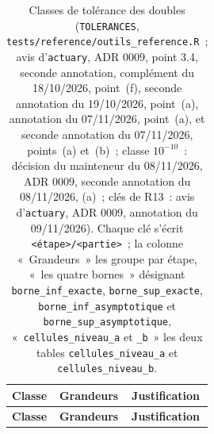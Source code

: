 \documentclass[a4paper,11pt]{article}
\newcommand{\code}[1]{\texttt{\small #1}}
\begin{document}
{\small
{}
\begin{longtable}{@{}p{1.4cm}>{\raggedright\arraybackslash}p{9.4cm}p{3.8cm}@{}}
\caption{Classes de tolérance des doubles (\code{TOLERANCES},
\code{tests/reference/outils\_reference.R}~; avis d'\code{actuary},
ADR 0009, point 3.4, seconde annotation, complément du 18/10/2026,
point~(f), seconde annotation du 19/10/2026, point~(a), annotation du
07/11/2026, point~(a), et seconde annotation du 07/11/2026, points~(a) et~(b)~; classe $10^{-10}$~: décision du mainteneur du 08/11/2026, ADR 0009, seconde annotation du 08/11/2026, (a)~; clés de R13~: avis d'\code{actuary}, ADR 0009, annotation du 09/11/2026).
Chaque clé s'écrit \code{<étape>/<partie>}~; la colonne «~Grandeurs~» les
groupe par étape, «~les quatre bornes~» désignant \code{borne\_inf\_exacte},
\code{borne\_sup\_exacte}, \code{borne\_inf\_asymptotique} et
\code{borne\_sup\_asymptotique}, «~\code{cellules\_niveau\_a} et
\code{\_b}~» les deux tables \code{cellules\_niveau\_a} et
\code{cellules\_niveau\_b}.}
\label{tab:tolerances}\\
\rowcolor{tableheader}
\textcolor{financeblue}{\textbf{Classe}} &
\textcolor{financeblue}{\textbf{Grandeurs}} &
\textcolor{financeblue}{\textbf{Justification}} \\
\endfirsthead
\rowcolor{tableheader}
\textcolor{financeblue}{\textbf{Classe}} &
\textcolor{financeblue}{\textbf{Grandeurs}} &
\textcolor{financeblue}{\textbf{Justification}} \\
\endhead

\end{longtable}}
\end{document}
